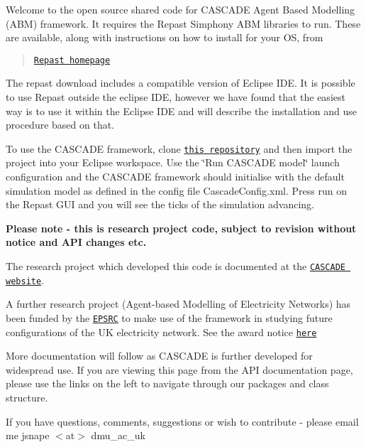 Welcome to the open source shared code for C\-A\-S\-C\-A\-D\-E Agent Based Modelling (A\-B\-M) framework. It requires the Repast Simphony A\-B\-M libraries to run. These are available, along with instructions on how to install for your O\-S, from

\begin{quotation}
\href{http://repast.sourceforge.net/}{\tt Repast homepage}

\end{quotation}


The repast download includes a compatible version of Eclipse I\-D\-E. It is possible to use Repast outside the eclipse I\-D\-E, however we have found that the easiest way is to use it within the Eclipse I\-D\-E and will describe the installation and use procedure based on that.

To use the C\-A\-S\-C\-A\-D\-E framework, clone \href{http://www.github.com/rsnape/cascade}{\tt this repository} and then import the project into your Eclipse workspace. Use the \char`\"{}\-Run C\-A\-S\-C\-A\-D\-E model\char`\"{} launch configuration and the C\-A\-S\-C\-A\-D\-E framework should initialise with the default simulation model as defined in the config file Cascade\-Config.\-xml. Press run on the Repast G\-U\-I and you will see the ticks of the simulation advancing.

{\bfseries Please note -\/ this is research project code, subject to revision without notice and A\-P\-I changes etc.}

The research project which developed this code is documented at the \href{http://www.iesd.dmu.ac.uk/~cascade}{\tt C\-A\-S\-C\-A\-D\-E website}.

A further research project (Agent-\/based Modelling of Electricity Networks) has been funded by the \href{http://www.epsrc.ac.uk}{\tt E\-P\-S\-R\-C} to make use of the framework in studying future configurations of the U\-K electricity network. See the award notice \href{http://gow.epsrc.ac.uk/NGBOViewGrant.aspx?GrantRef=EP/K033492/1}{\tt here}

More documentation will follow as C\-A\-S\-C\-A\-D\-E is further developed for widespread use. If you are viewing this page from the A\-P\-I documentation page, please use the links on the left to navigate through our packages and class structure.

If you have questions, comments, suggestions or wish to contribute -\/ please email me jsnape $<$at$>$ dmu\-\_\-ac\-\_\-uk 